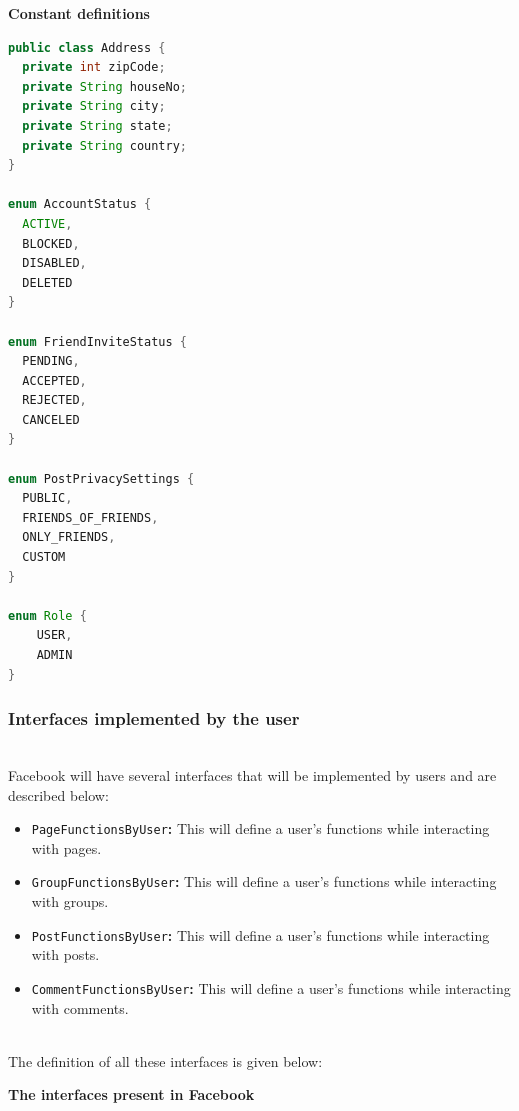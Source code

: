 \textbf{Constant definitions}

\begin{lstlisting}[language=Java]
public class Address {
  private int zipCode;
  private String houseNo;
  private String city;
  private String state;
  private String country;
}

enum AccountStatus {
  ACTIVE, 
  BLOCKED,
  DISABLED,
  DELETED 
}

enum FriendInviteStatus {
  PENDING, 
  ACCEPTED, 
  REJECTED, 
  CANCELED
}

enum PostPrivacySettings {
  PUBLIC, 
  FRIENDS_OF_FRIENDS, 
  ONLY_FRIENDS, 
  CUSTOM
}

enum Role {
    USER,
    ADMIN
}
\end{lstlisting}

\subsubsection{Interfaces implemented by the user}\label{YDQhuZ6auR1qtkJ9lVyTk}
\\
Facebook will have several interfaces that will be implemented by users and are described below:

\begin{itemize}
\item
\protect{}\label{jhh-T7CdV3hRibIQeasL3}
\texttt{PageFunctionsByUser}\textbf{:} This will define a user's functions while interacting with pages.
\item
\protect{}\label{LxaArrInwt5RjAOxUd8P4}
\texttt{GroupFunctionsByUser}\textbf{:} This will define a user's functions while interacting with groups.
\item
\protect{}\label{LAXqsKqjrDywQKIHWZLG3}
\texttt{PostFunctionsByUser}\textbf{:} This will define a user's functions while interacting with posts.
\item
\protect{}\label{cdtrkYZx2PV8iN0MAiIq_}
\texttt{CommentFunctionsByUser}\textbf{:} This will define a user's functions while interacting with comments.
\end{itemize}
\\
The definition of all these interfaces is given below:

\textbf{The interfaces present in Facebook}

